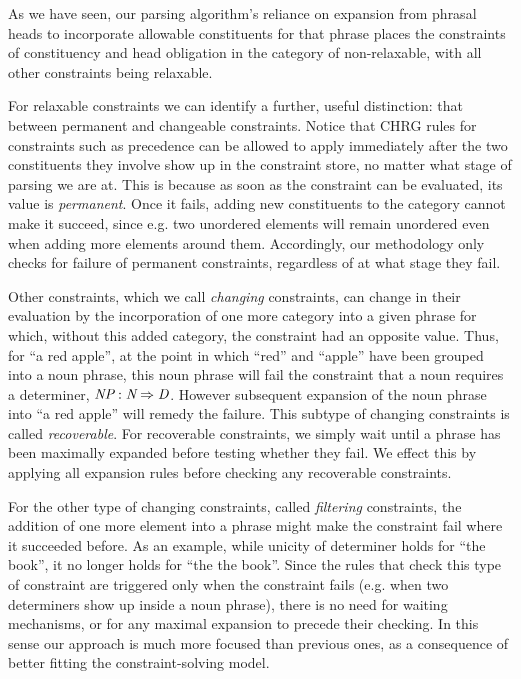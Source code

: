 \documentclass{llncs}
\newcommand{\requirement}[3]{\textit{#1} : \textit{#2} \Rightarrow \textit{#3}}
\newcommand{\NP}{\textit{NP}\xspace}
\begin{document}
As we have seen, our parsing algorithm's reliance on expansion from phrasal heads to incorporate allowable constituents for that phrase places  the constraints of constituency and head obligation in the category of non-relaxable, with all other constraints being relaxable.

For relaxable constraints we can identify a further, useful distinction: that between permanent and changeable constraints. Notice that CHRG rules  for constraints such as precedence can be allowed to apply  immediately after the two constituents they involve show up in the constraint store, no matter what stage of parsing we are at.  This is because as soon as the constraint can be evaluated, its value is \emph{permanent}. Once it fails, adding new constituents to the category cannot make it succeed, since e.g. two unordered elements will remain unordered even when adding more elements around them.  Accordingly, our methodology only checks for failure of permanent constraints, regardless of at what stage they fail.

Other constraints, which we call \emph{changing} constraints, can change in their  evaluation by the incorporation of one
more category into a given phrase for which, without this added category, the
constraint had an opposite value. Thus, for ``a red apple'',  at the point in which ``red'' and ``apple'' have been grouped into a noun phrase, this noun phrase will fail the constraint that a noun requires a determiner, $\requirement{\NP}{N}{D}$. However subsequent expansion of the noun phrase into ``a red apple'' will remedy the failure. This subtype of changing constraints is called \emph{recoverable}. For recoverable constraints, we simply wait until a phrase has been maximally expanded before testing whether they fail. We effect this by applying all expansion rules  before checking any recoverable constraints.

For the other type of changing constraints, called \emph{filtering} constraints, the addition of one more element into a phrase might make the constraint fail where it succeeded before. As an example, while unicity of determiner holds for ``the book'', it no longer holds for ``the the book''. Since the rules that check this type of constraint are triggered only when the constraint fails (e.g. when two determiners show up inside a noun phrase), there is no need for waiting mechanisms, or for any maximal expansion to precede their checking. In this sense our approach is much more focused than previous ones, as a consequence of better fitting the constraint-solving model. 
\end{document}
